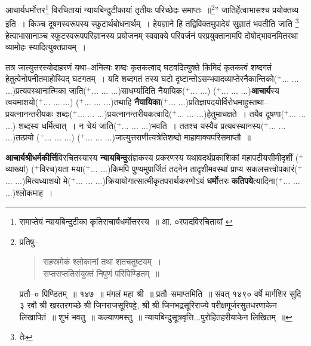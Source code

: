 \documentclass[article,12pt,a4paper]{memoir}
\newcommand{\add}[1]{($^{+}$#1)}
\begin{document}
	आचार्यधर्मोत्तर\footnote{समाप्तेयं न्यायबिन्दुटीका कृतिराचार्यधर्मोत्तरस्य ॥ आ. ०रपादविरचितायां \cite{dp-msB} \cite{dp-msD}} विरचितायां न्यायबिन्दुटीकायां तृतीयः परिच्छेदः समाप्तः ॥\footnote{\cite{dp-msA} \cite{dp-msB} प्रतिषु--
	    \begin{verse}
	सहस्रमेकं श्लोकानां तथा शतचतुष्टयम् ।\\
	    सप्तसप्ततिसंयुक्तं निपुणं परिपिण्डितम् ॥\\
	    
	    \end{verse}
	   \cite{dp-msD} प्रतौ--० पिण्डितम् ॥ १४७ ॥ मंगलं महा श्री ॥ \cite{dp-msC} प्रतौ--समाप्तमिति ॥ संवत् १४९० वर्षे मार्गशिर सुदि ३ रवौ श्री खरतरगच्छे श्री जिनराजसूरिपट्टे, श्री श्री जिनभद्रसूरिराज्ये परीक्षगूर्जरसुतधरणाकेन लिखापितं ॥ शुभं भवतु ॥ कल्याणमस्तु ॥ न्यायबिन्दुसूत्रवृत्ति...पुरोहितहरीयाकेन लिखितम् ॥}” जातिर्हेत्वाभासश्च प्रयोक्तव्य इति । किञ्च दूषणस्वरूपस्य स्फुटार्थबोधनार्थम् । हेयज्ञाने हि तद्विविक्तमुपादेयं सुज्ञातं भवतीति जाति \footnote{तेः} हेत्वाभासानाञ्च स्फुटस्वरूपपरिज्ञानस्य प्रयोजनम् स्ववाक्ये परिवर्जनं परप्रयुक्तानामपि दोषोद्भावनमितरथा व्यामोहः स्यादित्युक्तप्रायम् ।
	\pend
      

	  \pstart तत्र जात्युत्तरस्योदाहरणं यथा--अनित्यः शब्दः कृतकत्वाद् घटवदित्युक्ते किमिदं कृतकत्वं शब्दगतं हेतुत्वेनोपनीतमाहोस्विद् घटगतम् । यदि शब्दगतं तस्य घटो दृष्टान्तोऽसम्भवादव्याप्तेरनैकान्तिको\add{... ... ...}प्रत्यवस्थानात्मिका जाति\add{... ... ...}साधर्म्यादिति नैयायिक\add{... ...} \add{... ... ...}\textbf{आचार्य}स्य त्वयमाशयो\add{... ... ...} \add{... ... ...}तथाहि \textbf{नैयायिका}\add{... ...}प्रतिज्ञापदयोर्विरोधमाहुस्तथा--प्रयत्नानन्तरीयकः शब्दः\add{... ... ...}प्रयत्नानन्तरीयकत्वादि\add{... ... ...}हेतुमाचक्षते । तयैव दूषणा\add{... ... ...} शब्दस्य धर्मित्वात् । न चेयं जाति\add{... ... ...}भवति । ततश्च यस्यैव प्रत्यवस्थानस्य\add{... ... ...}तत्प्रयो \add{... ... ...} \add{... ... ...}जात्युत्तराणीत्यत्रेतिशब्दो माहावाक्यपरिसमाप्तौ ॥
	\pend

	  \pstart \textbf{आचार्यश्रीधर्मकीर्त्ति}विरचितस्यास्य \textbf{न्यायबिन्दु}संज्ञकस्य प्रकरणस्य यथावदर्थप्रकाशिकां महापटीयसीमीदृशीं \add{व्याख्यां} \add{विरच}यता मया\add{... ...}किमपि पुण्यमुपार्जितं तदनेन तादृशीमवस्थां प्राप्य सकलसत्त्वोपकारं\add{... ...}मित्यध्याशयो मे\add{... ... ...}क्रियायोगात्सात्मीकृतपरार्थकरणोऽयं \textbf{धर्मो}त्तरः \textbf{कतिपये}त्यादिना\add{... ... ...}श्लोकमाह ।
	\pend
      
\end{document}

